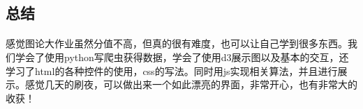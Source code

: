 \documentclass{article}
\begin{document}
\begin{CJK}{UTF8}{gkai}
\section{总结} %
	\paragraph{}
	感觉图论大作业虽然分值不高，但真的很有难度，也可以让自己学到很多东西。我们学会了使用python写爬虫获得数据，学会了使用d3展示图以及基本的交互，还学习了html的各种控件的使用，css的写法。同时用js实现相关算法，并且进行展示。感觉几天的刷夜，可以做出来一个如此漂亮的界面，非常开心，也有非常大的收获！
		

\end{CJK}
\end{document}
